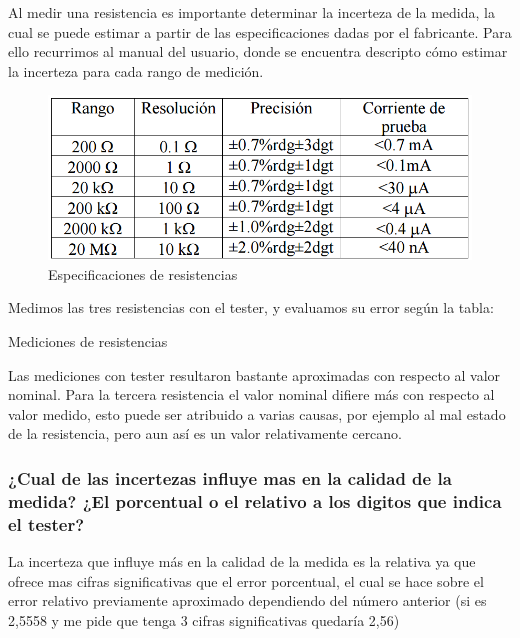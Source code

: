 \documentclass{article}
\begin{document}
Al medir una resistencia es importante determinar la incerteza de la 
medida, la cual se puede estimar a partir de las especificaciones dadas 
por el fabricante. Para ello recurrimos al manual del usuario, donde se 
encuentra descripto cómo estimar la incerteza para cada rango de 
medición.

\begin{figure}[ht]
\centering
\includegraphics[scale=0.30]{tabla_nominal_resistencias}
\caption{Especificaciones de resistencias}
\end{figure}

Medimos las tres resistencias con el tester, y evaluamos su error según la tabla:
\begin{table}[ht]
\begin{adjustbox}{max width=\columnwidth}

\end{adjustbox}
\caption{Mediciones de resistencias}
\end{table}

Las mediciones con tester resultaron bastante aproximadas 
con respecto al valor nominal. Para la tercera resistencia 
el valor nominal difiere más con respecto al valor medido, 
esto puede ser atribuido a varias causas, por ejemplo al mal
estado de la resistencia, pero aun así es un valor 
relativamente cercano.

\subsubsection{¿Cual de las incertezas influye mas en la calidad de la medida? ¿El porcentual o el relativo a los digitos que indica el tester?}

La incerteza que influye más en la calidad de la medida es la relativa ya que ofrece mas cifras significativas que el error porcentual, el cual se hace sobre el error relativo previamente aproximado dependiendo del número anterior (si es 2,5558 y me pide que tenga 3 cifras significativas quedaría 2,56)
\end{document}
